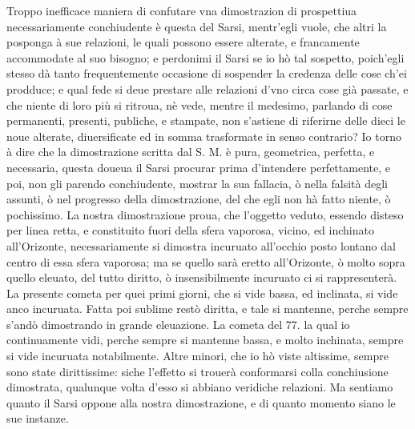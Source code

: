 \documentclass[11pt,twoside,openany]{book}
\begin{document}
Troppo inefficace maniera di confutare vna dimostrazion di prospettiua necessariamente conchiudente è questa del Sarsi, mentr'egli vuole, che altri la posponga à sue relazioni, le quali possono essere alterate, e francamente accommodate al suo bisogno; e perdonimi il Sarsi se io hò tal sospetto, poich'egli stesso dà tanto frequentemente occasione di sospender la credenza delle cose ch'ei prodduce; e qual fede si deue prestare alle relazioni d'vno circa cose già passate, e che niente di loro più si ritroua, nè vede, mentre il medesimo, parlando di cose permanenti, presenti, publiche, e stampate, non s'astiene di riferirne delle dieci le noue alterate, diuersificate ed in somma trasformate in senso contrario? Io torno à dire che la dimostrazione scritta dal S. M. è pura, geometrica, perfetta, e necessaria, questa doueua il Sarsi procurar prima d'intendere perfettamente, e poi, non gli parendo conchiudente, mostrar la sua fallacia, ò nella falsità degli assunti, ò nel progresso della dimostrazione, del che egli non hà fatto niente, ò pochissimo. La nostra dimostrazione proua, che l'oggetto veduto, essendo disteso per linea retta, e constituito fuori della sfera vaporosa, vicino, ed inchinato all'Orizonte, necessariamente si dimostra incuruato all'occhio posto lontano dal centro di essa sfera vaporosa; ma se quello sarà eretto all'Orizonte, ò molto sopra quello eleuato, del tutto diritto, ò insensibilmente incuruato ci si rappresenterà. La presente cometa per quei primi giorni, che si vide bassa, ed inclinata, si vide anco incuruata. Fatta poi sublime restò diritta, e tale si mantenne, perche sempre s'andò dimostrando in grande eleuazione. La cometa del 77. la qual io continuamente vidi, perche sempre si mantenne bassa, e molto inchinata, sempre si vide incuruata notabilmente. Altre minori, che io hò viste altissime, sempre sono state dirittissime: siche l'effetto si trouerà conformarsi colla conchiusione dimostrata, qualunque volta d'esso si abbiano veridiche relazioni. Ma sentiamo quanto il Sarsi oppone alla nostra dimostrazione, e di quanto momento siano le sue instanze.
\end{document}

